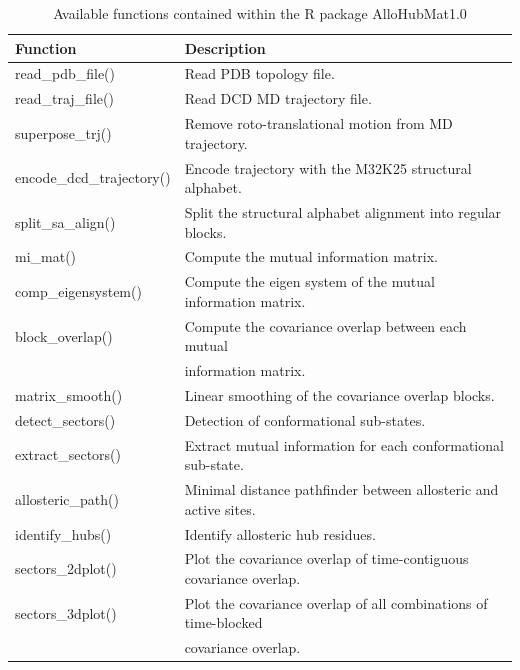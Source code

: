 \begin{table}[]
\centering
\caption{Available functions contained within the R package AlloHubMat1.0}
\label{tab:allomathub_functions}
\begin{tabular}{@{}ll@{}}
\toprule
Function           								& Description                                                                              												\\ \midrule
read\_pdb\_file()          					& Read PDB topology file.                                             															\\
read\_traj\_file()							& Read DCD MD trajectory file.										  															\\
superpose\_trj()							& Remove roto-translational motion from MD trajectory.													\\
encode\_dcd\_trajectory()    		& Encode trajectory with the M32K25 structural alphabet.              			                       \\
split\_sa\_align()   						& Split the structural alphabet alignment into regular blocks.                                          \\
mi\_mat()										& Compute the mutual information matrix.																				 \\
comp\_eigensystem()    		        & Compute the eigen system of the mutual information matrix.                      			     \\
block\_overlap()         					& Compute the covariance overlap between each mutual 													  \\
 & information matrix.				 \\                 
matrix\_smooth()   					    & Linear smoothing of the covariance overlap blocks.                               						   \\
detect\_sectors()						    & Detection of conformational sub-states.                                             									\\
extract\_sectors()  					    & Extract mutual information for each conformational sub-state.                    				   \\
allosteric\_path()  						& Minimal distance pathfinder between allosteric and active sites.                    					\\
identify\_hubs()   						    & Identify allosteric hub residues.                                        											           \\
sectors\_2dplot()   						& Plot the covariance overlap of time-contiguous covariance overlap.                  			\\
sectors\_3dplot()   						& Plot the covariance overlap of all combinations of time-blocked										\\
&  covariance overlap. \\ \bottomrule
\end{tabular}
\end{table}
